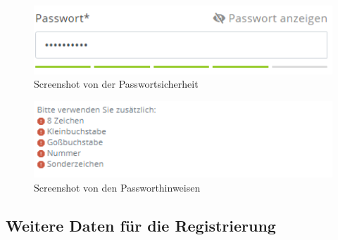 \begin{figure}[H]
	\centerline{
		\includegraphics[width=1\textwidth, frame]{./grafiken/passwordSecurity.PNG}
	}
	\caption{Screenshot von der Passwortsicherheit} \label{fig:pwSec}
\end{figure}
\begin{figure}[H]
	\centerline{
	\includegraphics[width=1\textwidth, frame]{./grafiken/passwordHints.PNG}
	}	
	\caption{Screenshot von den Passworthinweisen} \label{fig:pwHints}
\end{figure}

\subsection{Weitere Daten für die Registrierung}

